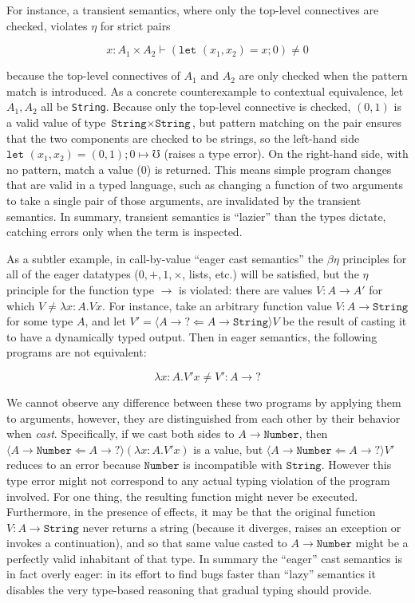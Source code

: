 \documentclass[acmsmall,nonacm]{acmart}
\newcommand{\dyn}{{?}}
\newcommand{\obcast}[2]{\langle{#1}\Leftarrow{#2}\rangle}
\newcommand{\err}{\mho}
\newcommand{\lett}{\kw{let}}
\newcommand{\letXbeYinZ}[2]{\lett#2 = #1;}
\newcommand{\kw}[1]{\texttt{#1}\,\,}
\begin{document}
For instance, a transient semantics, where only the top-level
connectives are checked, violates $\eta$ for strict pairs
\begin{small}
  \[ {x : A_1 \times A_2} \vdash (\letXbeYinZ x {(x_1,x_2)} 0) \neq 0 \]
\end{small}%
because the top-level connectives of $A_1$ and $A_2$ are only checked
when the pattern match is introduced. As a concrete counterexample to
contextual equivalence, let $A_1, A_2$ all be \texttt{String}.  Because
only the top-level connective is checked, $(0,1)$ is a valid value of
type $\texttt{String} \times \texttt{String}$, but pattern matching on
the pair ensures that the two components are checked to be strings, so
the left-hand side $\letXbeYinZ {(0,1)} {(x_1,x_2)} 0 \mapsto \err$
(raises a type error). On the right-hand side, with no pattern, match a
value (0) is returned. This means simple program changes that are valid
in a typed language, such as changing a function of two arguments to
take a single pair of those arguments, are invalidated by the transient
semantics.
%
In summary, transient semantics is ``lazier'' than the types dictate,
catching errors only when the term is inspected.

As a subtler example, in call-by-value ``eager cast semantics'' the
$\beta\eta$ principles for all of the eager datatypes ($0, +, 1,
\times$, lists, etc.) will be satisfied, but the $\eta$ principle for
the function type $\to$ is violated: there are values $V : A \to A'$ for
which $V \neq \lambda x:A. V x $.
%
For instance, take an arbitrary function value $V : A \to
\texttt{String}$ for some type $A$, and let $V' = \obcast{A \to
  \dyn}{A \to \texttt{String}}{V}$ be the result of casting it to have a
dynamically typed output.
%
Then in eager semantics, the following programs are not equivalent:
\begin{small}
\[   \lambda x:A. V' x \neq V' : A \to \dyn\]
\end{small}
%
We cannot observe any difference between these two programs by
applying them to arguments, however, they are distinguished from each
other by their behavior when \emph{cast}.
%
Specifically, if we cast both sides to $A \to \texttt{Number}$, then
$\obcast{A\to \texttt{Number}}{A\to\dyn}(\lambda x:A.V' x)$ is a
value, but $\obcast{A \to \texttt{Number}}{A\to \dyn}V'$ reduces to an
error because $\texttt{Number}$ is incompatible with
$\texttt{String}$.
%
However this type error might not correspond to any actual typing
violation of the program involved.
%
For one thing, the resulting function might never be executed.
%
Furthermore, in the presence of effects, it may be that the original
function $V : A \to \texttt{String}$ never returns a string (because
it diverges, raises an exception or invokes a continuation), and so
that same value casted to $A \to \texttt{Number}$ might be a perfectly
valid inhabitant of that type.
%
In summary the ``eager'' cast semantics is in fact overly eager: in
its effort to find bugs faster than ``lazy'' semantics it disables the
very type-based reasoning that gradual typing should provide.
\end{document}
